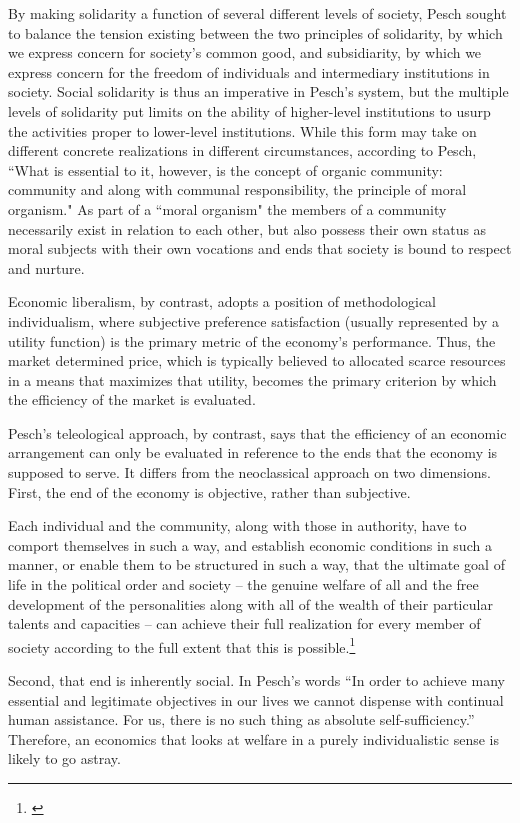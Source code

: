 \documentclass{article}
\begin{document}
By making solidarity a function of several different levels of society, Pesch sought to balance the tension existing between the two principles of solidarity, by which we express concern for society’s common good, and subsidiarity, by which we express concern for the freedom of individuals and intermediary institutions in society.  Social solidarity is thus an imperative in Pesch’s system, but the multiple levels of solidarity put limits on the ability of higher-level institutions to usurp the activities proper to lower-level institutions.  While this form may take on different concrete realizations in different circumstances, according to Pesch, ``What is essential to it, however, is the concept of organic community:  community and along with communal responsibility, the principle of moral organism." \citep[p. 81]{pesch1998}  As part of a ``moral organism" the members of a community necessarily exist in relation to each other, but also possess their own status as moral subjects with their own vocations and ends that society is bound to respect and nurture.\medskip

Economic liberalism, by contrast, adopts a position of methodological individualism, where subjective preference satisfaction (usually represented by a utility function) is the primary metric of the economy’s performance.  Thus, the market determined price, which is typically believed to allocated scarce resources in a means that maximizes that utility, becomes the primary criterion by which the efficiency of the market is evaluated.\medskip

Pesch’s teleological approach, by contrast, says that the efficiency of an economic arrangement can only be evaluated in reference to the ends that the economy is supposed to serve.  It differs from the neoclassical approach on two dimensions.  First, the end of the economy is objective, rather than subjective.
\begin{displayquote}
Each individual and the community, along with those in authority, have to comport themselves in such a way, and establish economic conditions in such a manner, or enable them to be structured in such a way, that the ultimate goal of life in the political order and society – the genuine welfare of all and the free development of the personalities along with all of the wealth of their particular talents and capacities – can achieve their full realization for every member of society according to the full extent that this is possible.\footnote{\citet[p.60]{pesch1998}}
\end{displayquote}
Second, that end is inherently social.  In Pesch’s words “In order to achieve many essential and legitimate objectives in our lives we cannot dispense with continual human assistance.  For us, there is no such thing as absolute self-sufficiency.” \citep[p. 7]{pesch1998}  Therefore, an economics that looks at welfare in a purely individualistic sense is likely to go astray.\medskip
\end{document}
